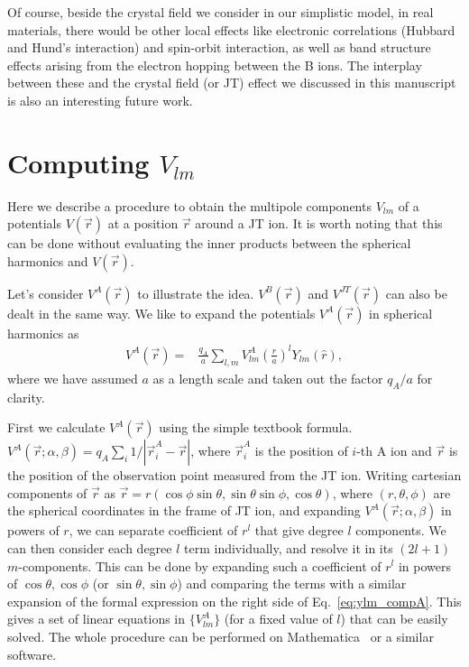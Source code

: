 \documentclass[a4paper,prb,twocolumn]{revtex4-1}  %
\begin{document}
Of course, beside the crystal field we consider in our simplistic model,
in real materials,
 there would be other local effects like
electronic correlations (Hubbard and Hund's interaction)
and spin-orbit interaction, 
as well as band structure effects arising from
the electron hopping between the B ions.
The interplay between these and the crystal field (or JT) effect 
we discussed in this manuscript is also an interesting future work.




\appendix*
\section{Computing $V_{lm}$}
\label{append:multipoles}

Here we describe a procedure to obtain the multipole components 
$V_{lm}$ of a potentials $V(\vec r)$ %
at a position $\vec r$ around a JT ion.
It is worth noting that this can be done without 
evaluating the 
inner products between the spherical harmonics and
$V(\vec r)$.


Let's consider $V^{A}(\vec r)$ to illustrate the idea. 
$V^{B}(\vec r)$ and $V^{JT}(\vec r)$ can also be dealt in the same way.
We like to expand the potentials $V^{A}(\vec r)$
in spherical harmonics as
\begin{align}
\label{eq:ylm_compA}
V^{A}(\vec r) =& \frac{q_A}{a}\sum_{l,m} V_{lm}^{A} \left(\frac{r}{a}\right)^l Y_{lm}(\hat r),
\end{align}
where we have assumed $a$ as a length scale and 
taken out the factor $q_A/a$ for clarity.

First we calculate
$V^{A}(\vec r)$
using the simple textbook formula.
$V^{A}(\vec r;\alpha,\beta)=q_A\sum_{i}1/|\vec r^A_i-\vec r |$, 
where $\vec r^A_i$ is the position of $i$-th A ion
and 
$\vec r$ is the position of the observation point 
measured from the JT ion.
Writing cartesian components of $\vec r$ as
$\vec r=r(\cos\phi\sin\theta,\sin\theta\sin\phi,\cos\theta)$,
where $(r,\theta,\phi)$ 
are the spherical coordinates in the frame of JT ion,
and expanding 
${V^{A}(\vec r;\alpha,\beta)}$
in powers of $r$, 
we can separate 
coefficient of $r^l$
that give degree $l$ components.
We can then consider each degree $l$ term individually,
and resolve it in its $(2l+1)$ $m$-components.
This can be done by 
expanding such a coefficient of $r^l$
in powers of $\cos\theta, \cos\phi$ 
(or $\sin\theta, \sin\phi$) 
and comparing the terms with a similar expansion of 
the formal expression on the right side 
of Eq.~\ref{eq:ylm_compA}.
This gives a set of
linear equations in $\{V_{lm}^{A}\}$ (for a fixed value of $l$)
 that can be easily solved.
The whole procedure can be performed
 on Mathematica~\cite{Mathematica}
or a similar software.



\label{Bibliography}
%

\end{document}
